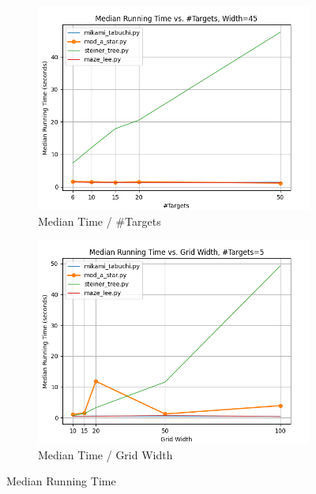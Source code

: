 \begin{figure}
\centering

\begin{subfigure}[b]{\linewidth}
    \includegraphics[width=\linewidth]{figures/plots/medianTime_areaConst.png}
    \caption{Median Time / \#Targets}
\end{subfigure}
\begin{subfigure}[b]{\linewidth}
    \includegraphics[width=\linewidth]{figures/plots/medianTime_nConst.png}
    \caption{Median Time / Grid Width}
\end{subfigure}

\caption{Median Running Time}
\label{fig:medianRunningTime}
\end{figure}

